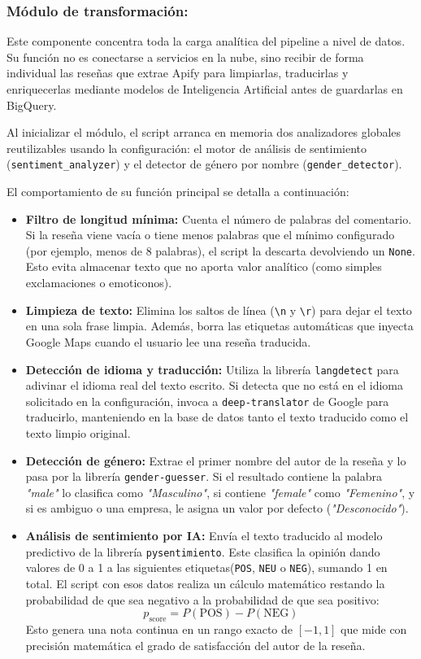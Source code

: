 \subsubsection{Módulo de transformación: }
Este componente concentra toda la carga analítica del pipeline a nivel de datos. Su función no es conectarse a servicios en la nube, sino recibir de forma individual las reseñas que extrae Apify para limpiarlas, traducirlas y enriquecerlas mediante modelos de Inteligencia Artificial antes de guardarlas en BigQuery.

Al inicializar el módulo, el script arranca en memoria dos analizadores globales reutilizables usando la configuración: el motor de análisis de sentimiento (\texttt{sentiment\_analyzer}) y el detector de género por nombre (\texttt{gender\_detector}).

El comportamiento de su función principal se detalla a continuación:
\begin{itemize}
    \item \textbf{Filtro de longitud mínima:} Cuenta el número de palabras del comentario. Si la reseña viene vacía o tiene menos palabras que el mínimo configurado (por ejemplo, menos de 8 palabras), el script la descarta devolviendo un \texttt{None}. Esto evita almacenar texto que no aporta valor analítico (como simples exclamaciones o emoticonos).
    \item \textbf{Limpieza de texto:} Elimina los saltos de línea (\texttt{\textbackslash n} y \texttt{\textbackslash r}) para dejar el texto en una sola frase limpia. Además, borra las etiquetas automáticas que inyecta Google Maps cuando el usuario lee una reseña traducida.
    \item \textbf{Detección de idioma y traducción:} Utiliza la librería \texttt{langdetect} para adivinar el idioma real del texto escrito. Si detecta que no está en el idioma solicitado en la configuración, invoca a \texttt{deep-translator} de Google para traducirlo, manteniendo en la base de datos tanto el texto traducido como el texto limpio original.
    \item \textbf{Detección de género:} Extrae el primer nombre del autor de la reseña y lo pasa por la librería \texttt{gender-guesser}. Si el resultado contiene la palabra \textit{"male"} lo clasifica como \textit{"Masculino"}, si contiene \textit{"female"} como \textit{"Femenino"}, y si es ambiguo o una empresa, le asigna un valor por defecto (\textit{"Desconocido"}).
    \item \textbf{Análisis de sentimiento por IA:} Envía el texto traducido al modelo predictivo de la librería \texttt{pysentimiento}. Este clasifica la opinión dando valores de 0 a 1 a las siguientes etiquetas(\texttt{POS}, \texttt{NEU} o \texttt{NEG}), sumando 1 en total. El script con esos datos realiza un cálculo matemático restando la probabilidad de que sea negativo a la probabilidad de que sea positivo:
    $$p_{\text{score}} = P(\text{POS}) - P(\text{NEG})$$
    Esto genera una nota continua en un rango exacto de $[-1, 1]$ que mide con precisión matemática el grado de satisfacción del autor de la reseña.
\end{itemize}

